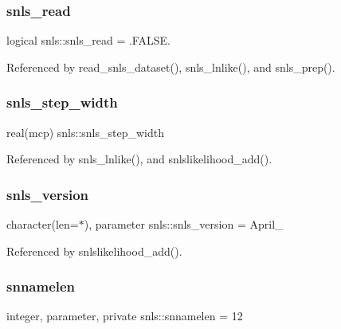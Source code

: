 \subsubsection{\texorpdfstring{snls\+\_\+read}{snls\_read}}
{\footnotesize\ttfamily logical snls\+::snls\+\_\+read = .F\+A\+L\+S\+E.\hspace{0.3cm}{\ttfamily [private]}}



Referenced by read\+\_\+snls\+\_\+dataset(), snls\+\_\+lnlike(), and snls\+\_\+prep().

\mbox{\label{namespacesnls_a3a7f05d5e17b5868642de17a8d101626}} 
\subsubsection{\texorpdfstring{snls\+\_\+step\+\_\+width}{snls\_step\_width}}
{\footnotesize\ttfamily real(mcp) snls\+::snls\+\_\+step\+\_\+width\hspace{0.3cm}{\ttfamily [private]}}



Referenced by snls\+\_\+lnlike(), and snlslikelihood\+\_\+add().

\mbox{\label{namespacesnls_a919a8bb686436d27901e5de9a8880f26}} 
\subsubsection{\texorpdfstring{snls\+\_\+version}{snls\_version}}
{\footnotesize\ttfamily character(len=$\ast$), parameter snls\+::snls\+\_\+version = \textquotesingle{}April\+\_\textquotesingle{}\hspace{0.3cm}{\ttfamily [private]}}



Referenced by snlslikelihood\+\_\+add().

\mbox{\label{namespacesnls_a0985d8ccb89aafea09ab6de4c78c5600}} 
\subsubsection{\texorpdfstring{snnamelen}{snnamelen}}
{\footnotesize\ttfamily integer, parameter, private snls\+::snnamelen = 12\hspace{0.3cm}{\ttfamily [private]}}

